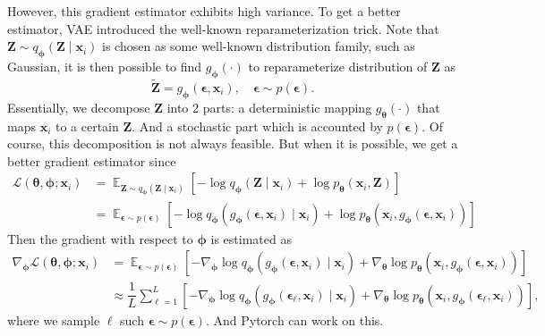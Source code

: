 \documentclass[11pt,a4paper]{article}
\begin{document}
However, this gradient estimator exhibits high variance. To get a better estimator, VAE introduced the well-known reparameterization trick.
Note that $\bm{Z} \sim q_{\boldsymbol \phi}(\bm{Z} \mid \bm{x}_i)$ is chosen as some well-known distribution family, such as Gaussian, it is then possible to find $g_{\boldsymbol \phi}(\cdot)$ to reparameterize distribution of $\bm{Z}$ as
\[
\widetilde{\bm{Z}} = g_{\boldsymbol \phi}(\boldsymbol \epsilon, \bm{x}_i), \quad \boldsymbol \epsilon  \sim p(\boldsymbol \epsilon).
\] 
Essentially, we decompose $\bm{Z}$ into 2 parts: a deterministic mapping $g_{\boldsymbol \theta}(\cdot)$ that maps $\bm{x}_i$ to a certain $\bm{Z}$. And a stochastic part which is accounted by $p(\boldsymbol \epsilon)$. Of course, this decomposition is not always feasible. But when it is possible,
we get a better gradient estimator since
\begin{align*}
\mathcal{L}(\boldsymbol \theta, \boldsymbol \phi; \bm{x}_i)
&= \mathop{\mathbb{E}}_{\bm{Z} \sim q_{\boldsymbol \phi}(\bm{Z} \mid \bm{x}_i)} \left[ -\log q_{\boldsymbol \phi}(\bm{Z} \mid \bm{x}_i) + \log p_{\boldsymbol \theta}(\bm{x}_i, \bm{Z}) \right] \\
&= \mathop{\mathbb{E}}_{\boldsymbol \epsilon \sim p(\boldsymbol \epsilon)} \left[ -\log q_{\boldsymbol \phi}(g_{\boldsymbol \phi}(\boldsymbol \epsilon, \bm{x}_i) \mid \bm{x}_i) + \log p_{\boldsymbol \theta} (\bm{x}_i, g_{\boldsymbol \phi}(\boldsymbol \epsilon, \bm{x}_i))\right]
\end{align*} 
Then the gradient with respect to $\boldsymbol \phi$ is estimated as
\begin{align*}
\nabla_{\boldsymbol \phi} \mathcal{L}(\boldsymbol \theta, \boldsymbol \phi; \bm{x}_i)
&= \mathop{\mathbb{E}}_{\boldsymbol \epsilon \sim p(\boldsymbol \epsilon)} \left[ - \nabla_{\boldsymbol \phi} \log q_{\boldsymbol \phi}(g_{\boldsymbol \phi}(\boldsymbol \epsilon, \bm{x}_i) \mid \bm{x}_i) + \nabla_{\boldsymbol \theta} \log p_{\boldsymbol \theta} (\bm{x}_i, g_{\boldsymbol \phi}(\boldsymbol \epsilon, \bm{x}_i))\right] \\
&\approx \dfrac{1}{L} \sum^{L}_{\ell =1}  \left[ - \nabla_{\boldsymbol \phi} \log q_{\boldsymbol \phi}(g_{\boldsymbol \phi}(\boldsymbol \epsilon_\ell , \bm{x}_i) \mid \bm{x}_i) + \nabla_{\boldsymbol \theta} \log p_{\boldsymbol \theta} (\bm{x}_i, g_{\boldsymbol \phi}(\boldsymbol \epsilon_\ell , \bm{x}_i))\right],
\end{align*} 
where we sample $\ell $ such $\boldsymbol \epsilon \sim p(\boldsymbol \epsilon)$.
And Pytorch can work on this.
\end{document}
